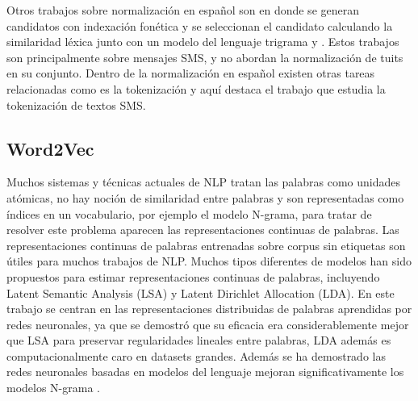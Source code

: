 \documentclass[spanish,12pt, a4paper,twoside]{paper}
\begin{document}
Otros trabajos sobre normalización en español son \cite{mosquera:2012} en donde se generan candidatos con indexación fonética y se seleccionan el candidato calculando la similaridad léxica junto con un modelo del lenguaje trigrama y \cite{oliva:2011}. Estos trabajos son principalmente sobre mensajes SMS, y no abordan la normalización de tuits en su conjunto. Dentro de la normalización en español existen otras tareas relacionadas como es la tokenización y aquí destaca el trabajo \cite{gomezhidalgo:2013} que estudia la tokenización de textos SMS.

\subsection{Word2Vec}\label{sec:word2vec}
Muchos sistemas y técnicas actuales de NLP tratan las palabras como unidades atómicas, no hay noción de similaridad entre palabras y son representadas como índices en un vocabulario, por ejemplo el modelo N-grama, para tratar de resolver este problema aparecen las representaciones continuas de palabras. Las representaciones continuas de palabras entrenadas sobre corpus sin etiquetas son útiles para muchos trabajos de NLP. Muchos tipos diferentes de modelos han sido propuestos para estimar representaciones continuas de palabras, incluyendo Latent Semantic Analysis (LSA) y Latent Dirichlet Allocation (LDA). En este trabajo se centran en las representaciones distribuidas de palabras aprendidas por redes neuronales, ya que se demostró que su eficacia era considerablemente mejor que LSA para preservar regularidades lineales entre palabras, LDA además es computacionalmente caro en datasets grandes. Además se ha demostrado las redes neuronales basadas en modelos del lenguaje mejoran significativamente los modelos N-grama \cite{bengio:2003} \cite{mikolov:2011} \cite{schwenk:2007}.\\
\end{document}
